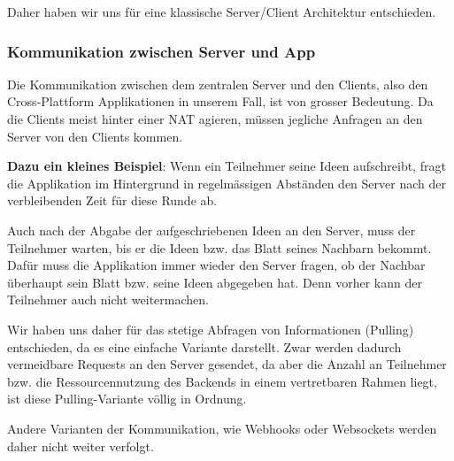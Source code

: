 Daher haben wir uns für eine klassische Server/Client Architektur entschieden.

\subsubsection{Kommunikation zwischen Server und App}
Die Kommunikation zwischen dem zentralen Server und den Clients, also den Cross-Plattform Applikationen in unserem Fall, ist von grosser Bedeutung. Da die Clients meist hinter einer NAT \cite{NAT} agieren, müssen jegliche Anfragen an den Server von den Clients kommen.


\textbf{Dazu ein kleines Beispiel}: Wenn ein Teilnehmer seine Ideen aufschreibt, fragt die Applikation im Hintergrund in regelmässigen Abständen den Server nach der verbleibenden Zeit für diese Runde ab.


Auch nach der Abgabe der aufgeschriebenen Ideen an den Server, muss der Teilnehmer warten, bis er die Ideen bzw. das Blatt seines Nachbarn bekommt. Dafür muss die Applikation immer wieder den Server fragen, ob der Nachbar überhaupt sein Blatt bzw. seine Ideen abgegeben hat. Denn vorher kann der Teilnehmer auch nicht weitermachen.


Wir haben uns daher für das stetige Abfragen von Informationen (Pulling) entschieden, da es eine einfache Variante darstellt. Zwar werden dadurch vermeidbare Requests an den Server gesendet, da aber die Anzahl an Teilnehmer bzw. die Ressourcennutzung des Backends in einem vertretbaren Rahmen liegt, ist diese Pulling-Variante völlig in Ordnung.  


Andere Varianten der Kommunikation, wie Webhooks oder Websockets werden daher nicht weiter verfolgt.